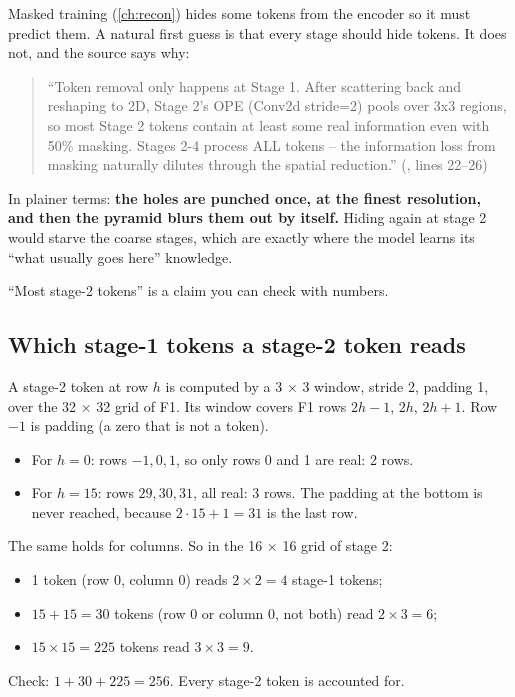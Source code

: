 Masked training (\cref{ch:recon}) hides some tokens from the encoder so it must predict them. A natural
first guess is that every stage should hide tokens. It does not, and the source says why:
\begin{quote}\small
``Token removal only happens at Stage 1. After scattering back and reshaping to 2D, Stage 2's OPE
(Conv2d stride=2) pools over 3x3 regions, so most Stage 2 tokens contain at least some real information
even with 50\% masking. Stages 2-4 process ALL tokens -- the information loss from masking naturally
dilutes through the spatial reduction.'' (, lines 22--26)
\end{quote}
In plainer terms: \textbf{the holes are punched once, at the finest resolution, and then the pyramid
blurs them out by itself.} Hiding again at stage 2 would starve the coarse stages, which are exactly
where the model learns its ``what usually goes here'' knowledge.

``Most stage-2 tokens'' is a claim you can check with numbers.

\subsection{Which stage-1 tokens a stage-2 token reads}

A stage-2 token at row $h$ is computed by a 3 $\times$ 3 window, stride 2, padding 1, over the 32
$\times$ 32 grid of F1. Its window covers F1 rows $2h - 1$, $2h$, $2h + 1$. Row $-1$ is padding (a
zero that is not a token).
\begin{itemize}
\item For $h = 0$: rows $-1, 0, 1$, so only rows 0 and 1 are real: 2 rows.
\item For $h = 15$: rows $29, 30, 31$, all real: 3 rows. The padding at the bottom is never reached,
because $2 \cdot 15 + 1 = 31$ is the last row.
\end{itemize}
The same holds for columns. So in the 16 $\times$ 16 grid of stage 2:
\begin{itemize}
\item 1 token (row 0, column 0) reads $2 \times 2 = 4$ stage-1 tokens;
\item $15 + 15 = 30$ tokens (row 0 or column 0, not both) read $2 \times 3 = 6$;
\item $15 \times 15 = 225$ tokens read $3 \times 3 = 9$.
\end{itemize}
Check: $1 + 30 + 225 = 256$. Every stage-2 token is accounted for.

